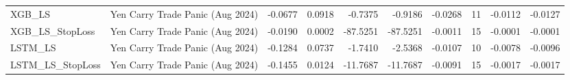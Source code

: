 \begin{tabular}{llrrrrrrrr}
\cline{1-10}
XGB\_LS & Yen Carry Trade Panic (Aug 2024) & -0.0677 & 0.0918 & -0.7375 & -0.9186 & -0.0268 & 11 & -0.0112 & -0.0127 \\
\cline{1-10}
XGB\_LS\_StopLoss & Yen Carry Trade Panic (Aug 2024) & -0.0190 & 0.0002 & -87.5251 & -87.5251 & -0.0011 & 15 & -0.0001 & -0.0001 \\
\cline{1-10}
LSTM\_LS & Yen Carry Trade Panic (Aug 2024) & -0.1284 & 0.0737 & -1.7410 & -2.5368 & -0.0107 & 10 & -0.0078 & -0.0096 \\
\cline{1-10}
LSTM\_LS\_StopLoss & Yen Carry Trade Panic (Aug 2024) & -0.1455 & 0.0124 & -11.7687 & -11.7687 & -0.0091 & 15 & -0.0017 & -0.0017 \\
\cline{1-10}
\bottomrule
\end{tabular}
